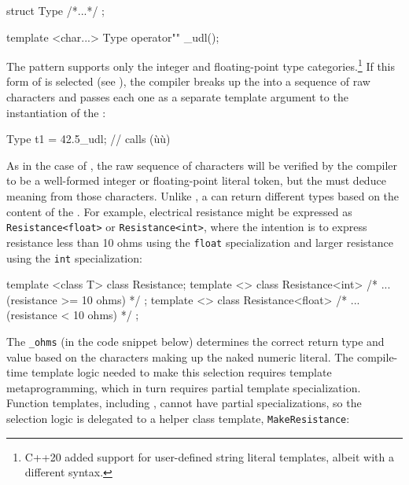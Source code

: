 \begin{emcppslisting}
struct Type { /*...*/ };

template <char...> Type operator"" _udl();
\end{emcppslisting}
    
\noindent The  pattern supports only the integer
and floating-point type categories.{\cprotect\footnote{C++20 added
support for user-defined string literal templates, albeit with a
  different syntax.}} If this form of  is selected
(see ), the compiler breaks up the
 into a sequence of raw characters and passes each
one as a separate template argument to the instantiation of the
:

\begin{emcppslisting}
Type t1 = 42.5_udl;  // calls (ù{}ù)
\end{emcppslisting}
    
\noindent As in the case of , the raw sequence of
characters will be verified by the compiler to be a well-formed integer
or floating-point literal token, but the  must
deduce meaning from those characters. Unlike ,
a  can return different types based on
the content of the . For example, electrical
resistance might be expressed as \lstinline!Resistance<float>! or
\lstinline!Resistance<int>!, where the intention is to express resistance
less than 10 ohms using the \lstinline!float! specialization and larger
resistance using the \lstinline!int! specialization:

\begin{emcppslisting}
template <class T> class Resistance;
template <> class Resistance<int>   { /* ... (resistance >= 10 ohms) */ };
template <> class Resistance<float> { /* ... (resistance <  10 ohms) */ };
\end{emcppslisting}
    
\noindent The \lstinline!_ohms!  (in the code snippet below) determines the correct
return type and value based on the characters making up the naked
numeric literal. The compile-time template logic needed to make this
selection requires template metaprogramming, which in turn requires
partial template specialization. Function templates, including
, cannot have partial specializations,
so the selection logic is delegated to a helper class template,
\lstinline!MakeResistance!:

